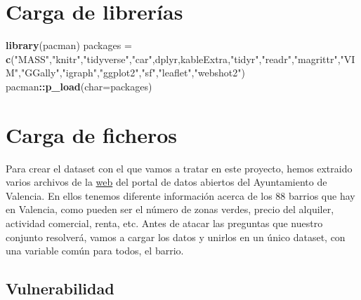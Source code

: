 \documentclass[notspecified,article,submit,moreauthors,pdftex]{Definitions/mdpi}
\newenvironment{Shaded}{\begin{snugshade}}{\end{snugshade}}
\newcommand{\AttributeTok}[1]{\textcolor[rgb]{0.13,0.29,0.53}{#1}}
\newcommand{\FunctionTok}[1]{\textcolor[rgb]{0.13,0.29,0.53}{\textbf{#1}}}
\newcommand{\NormalTok}[1]{#1}
\newcommand{\OtherTok}[1]{\textcolor[rgb]{0.56,0.35,0.01}{#1}}
\newcommand{\SpecialCharTok}[1]{\textcolor[rgb]{0.81,0.36,0.00}{\textbf{#1}}}
\newcommand{\StringTok}[1]{\textcolor[rgb]{0.31,0.60,0.02}{#1}}
\begin{document}

\hypertarget{carga-de-libreruxedas}{%
\section{Carga de librerías}\label{carga-de-libreruxedas}}

\begin{Shaded}
\begin{Highlighting}[]
\FunctionTok{library}\NormalTok{(pacman)}
\NormalTok{packages }\OtherTok{=} \FunctionTok{c}\NormalTok{(}\StringTok{"MASS"}\NormalTok{,}\StringTok{"knitr"}\NormalTok{,}\StringTok{"tidyverse"}\NormalTok{,}\StringTok{"car"}\NormalTok{,}\StringTok{\textquotesingle{}dplyr\textquotesingle{}}\NormalTok{,}\StringTok{\textquotesingle{}kableExtra\textquotesingle{}}\NormalTok{,}\StringTok{"tidyr"}\NormalTok{,}\StringTok{"readr"}\NormalTok{,}\StringTok{"magrittr"}\NormalTok{,}\StringTok{"VIM"}\NormalTok{,}\StringTok{"GGally"}\NormalTok{,}\StringTok{"igraph"}\NormalTok{,}\StringTok{"ggplot2"}\NormalTok{,}\StringTok{"sf"}\NormalTok{,}\StringTok{"leaflet"}\NormalTok{,}\StringTok{"webshot2"}\NormalTok{)}
\NormalTok{pacman}\SpecialCharTok{::}\FunctionTok{p\_load}\NormalTok{(}\AttributeTok{char=}\NormalTok{packages)}
\end{Highlighting}
\end{Shaded}

\hypertarget{carga-de-ficheros}{%
\section{Carga de ficheros}\label{carga-de-ficheros}}

Para crear el dataset con el que vamos a tratar en este proyecto, hemos
extraido varios archivos de la
\href{https://valencia.opendatasoft.com/pages/home/}{web} del portal de
datos abiertos del Ayuntamiento de Valencia. En ellos tenemos diferente
información acerca de los 88 barrios que hay en Valencia, como pueden
ser el número de zonas verdes, precio del alquiler, actividad comercial,
renta, etc. Antes de atacar las preguntas que nuestro conjunto
resolverá, vamos a cargar los datos y unirlos en un único dataset, con
una variable común para todos, el barrio.

\hypertarget{vulnerabilidad}{%
\subsection{Vulnerabilidad}\label{vulnerabilidad}}
\end{document}
